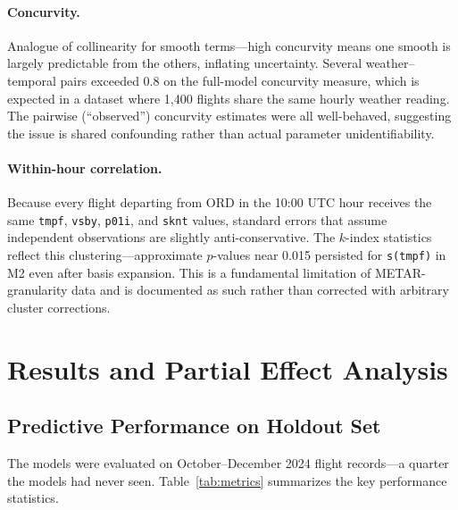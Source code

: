 \documentclass[12pt, a4paper]{article}
\begin{document}
\paragraph{Concurvity.} Analogue of collinearity for smooth terms---high concurvity means one smooth is largely predictable from the others, inflating uncertainty. Several weather--temporal pairs exceeded 0.8 on the full-model concurvity measure, which is expected in a dataset where 1,400 flights share the same hourly weather reading. The pairwise (``observed'') concurvity estimates were all well-behaved, suggesting the issue is shared confounding rather than actual parameter unidentifiability.

\paragraph{Within-hour correlation.} Because every flight departing from ORD in the 10:00 UTC hour receives the same \texttt{tmpf}, \texttt{vsby}, \texttt{p01i}, and \texttt{sknt} values, standard errors that assume independent observations are slightly anti-conservative. The $k$-index statistics reflect this clustering---approximate $p$-values near 0.015 persisted for \texttt{s(tmpf)} in M2 even after basis expansion. This is a fundamental limitation of METAR-granularity data and is documented as such rather than corrected with arbitrary cluster corrections.

\section{Results and Partial Effect Analysis}
\label{sec:results}

\subsection{Predictive Performance on Holdout Set}

The models were evaluated on October--December 2024 flight records---a quarter the models had never seen. Table~\ref{tab:metrics} summarizes the key performance statistics.
\end{document}
